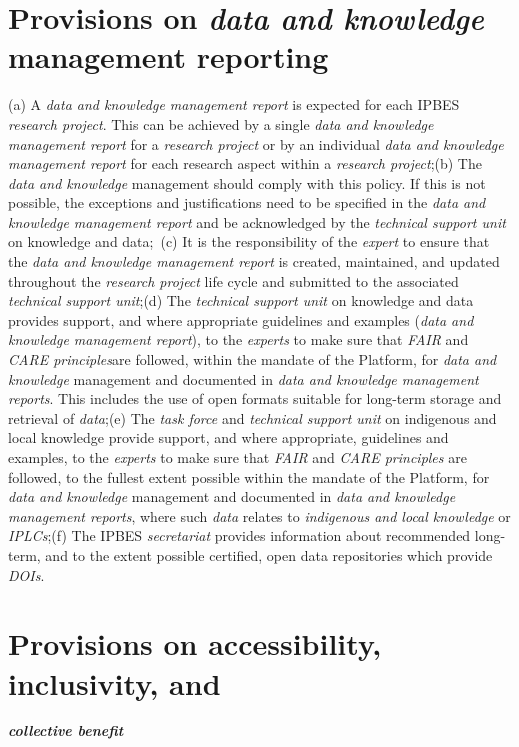 \documentclass{article}
\begin{document}
\section*{Provisions on \textit{\textbf{data and knowledge}}\textbf{ management reporting}}

(a) A \textit{data and knowledge management report} is expected for each IPBES \textit{research project}. This can be achieved by a single \textit{data and knowledge management report} for a \textit{research project} or by an individual \textit{data and knowledge management report} for each research aspect within a \textit{research project};(b) The \textit{data and knowledge }management should comply with this policy. If this is not possible, the exceptions and justifications need to be specified in the \textit{data and knowledge management report} and be acknowledged by the \textit{technical support unit} on knowledge and data; (c) It is the responsibility of the \textit{expert }to ensure that the \textit{data and knowledge management report} is created, maintained, and updated throughout the \textit{research project }life cycle and submitted to the associated\textit{ technical support unit};(d) The \textit{technical support unit} on knowledge and data provides support, and where appropriate guidelines and examples (\textit{data and knowledge management report}), to the \textit{experts }to make sure that \textit{FAIR }and\textit{ CARE principles}are followed, within the mandate of the Platform, for \textit{data and knowledge }management and documented in \textit{data and knowledge management reports}. This includes the use of open formats suitable for long-term storage and retrieval of \textit{data};(e) The \textit{task force} and \textit{technical support unit} on indigenous and local knowledge provide support, and where appropriate, guidelines and examples, to the \textit{experts }to make sure that \textit{FAIR} and \textit{CARE principles} are followed, to the fullest extent possible within the mandate of the Platform, for \textit{data and knowledge }management and documented in \textit{data and knowledge management reports}, where such \textit{data} relates to \textit{indigenous and local knowledge} or\textit{ IPLCs};(f) The IPBES \textit{secretariat }provides information about recommended long-term, and to the extent possible certified, open data repositories which provide \textit{DOIs}.

\section*{Provisions on accessibility, inclusivity, and }\textit{\textbf{collective benefit}}
\end{document}
